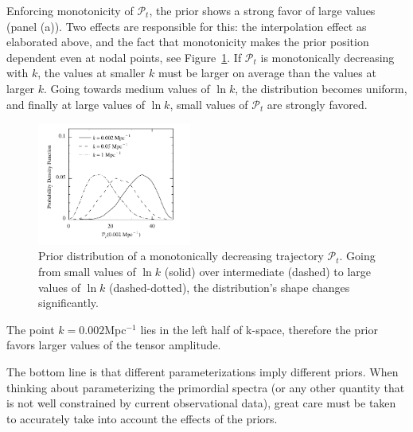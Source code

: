 \documentclass[a4paper,11pt]{article}
\newcommand{\ptensor}{{\mathcal{P}_t}}
\begin{document}
Enforcing monotonicity of $\ptensor$, the prior shows a strong
favor of large values (panel (a)). Two effects are responsible for
this: the interpolation effect as elaborated above, and the fact that
monotonicity makes the prior position dependent even at nodal points,
see Figure~\ref{fig:monotonicity}. If $\ptensor$ is monotonically
decreasing with $k$, the values at smaller $k$ must be larger on
average than the values at larger $k$. Going towards medium values of
$\ln k$, the distribution becomes uniform, and finally at large values
of $\ln k$, small values of $\ptensor$ are strongly favored.
\begin{figure}
  \begin{center}
    \includegraphics[width=0.45\textwidth]{prior_monopt}
  \end{center}
  \caption{Prior distribution of a monotonically decreasing trajectory
    $\ptensor$. Going from small values of $\ln k$ (solid) over
    intermediate (dashed) to large values of $\ln k$ (dashed-dotted),
    the distribution's shape changes significantly.}
  \label{fig:monotonicity}
\end{figure}
The point $k=0.002$Mpc$^{-1}$ lies in the left half of k-space,
therefore the prior favors larger values of the tensor amplitude.

The bottom line is that different parameterizations imply different
priors. When thinking about parameterizing the primordial spectra (or
any other quantity that is not well constrained by current
observational data), great care must be taken to accurately take into
account the effects of the priors.


  

\end{document}
